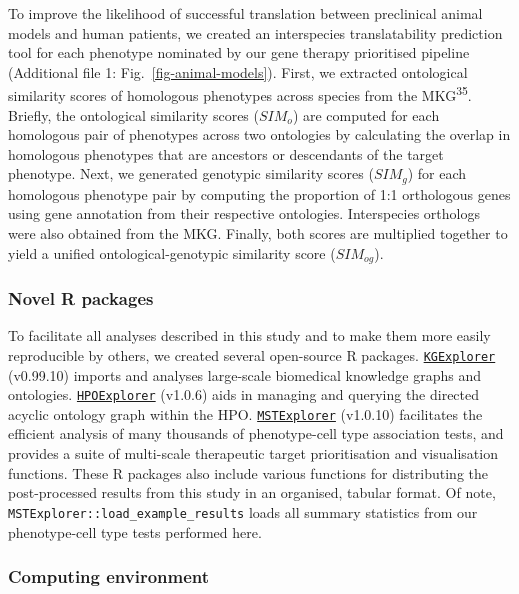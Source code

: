 \documentclass[
]{article}
\begin{document}
To improve the likelihood of successful translation between preclinical
animal models and human patients, we created an interspecies
translatability prediction tool for each phenotype nominated by our gene
therapy prioritised pipeline (Additional file 1:
Fig.~\ref{fig-animal-models}). First, we extracted ontological
similarity scores of homologous phenotypes across species from the
MKG\textsuperscript{35}. Briefly, the ontological similarity scores
(\(SIM_o\)) are computed for each homologous pair of phenotypes across
two ontologies by calculating the overlap in homologous phenotypes that
are ancestors or descendants of the target phenotype. Next, we generated
genotypic similarity scores (\(SIM_g\)) for each homologous phenotype
pair by computing the proportion of 1:1 orthologous genes using gene
annotation from their respective ontologies. Interspecies orthologs were
also obtained from the MKG. Finally, both scores are multiplied together
to yield a unified ontological-genotypic similarity score
(\(SIM_{og}\)).

\subsubsection{Novel R packages}\label{novel-r-packages}

To facilitate all analyses described in this study and to make them more
easily reproducible by others, we created several open-source R
packages.
\href{https://github.com/neurogenomics/KGExplorer}{\texttt{KGExplorer}}
(v0.99.10) imports and analyses large-scale biomedical knowledge graphs
and ontologies.
\href{https://github.com/neurogenomics/HPOExplorer}{\texttt{HPOExplorer}}
(v1.0.6) aids in managing and querying the directed acyclic ontology
graph within the HPO.
\href{https://github.com/neurogenomics/MSTExplorer}{\texttt{MSTExplorer}}
(v1.0.10) facilitates the efficient analysis of many thousands of
phenotype-cell type association tests, and provides a suite of
multi-scale therapeutic target prioritisation and visualisation
functions. These R packages also include various functions for
distributing the post-processed results from this study in an organised,
tabular format. Of note, \texttt{MSTExplorer::load\_example\_results}
loads all summary statistics from our phenotype-cell type tests
performed here.

\subsubsection{Computing environment}\label{computing-environment}
\end{document}
